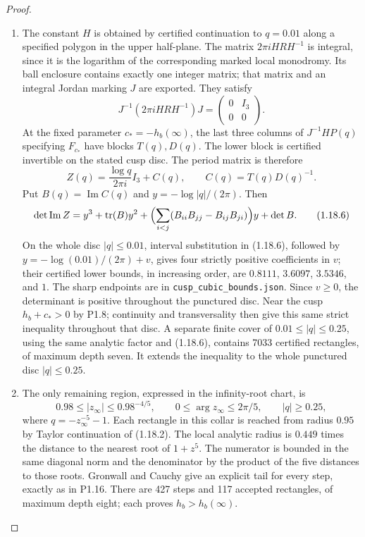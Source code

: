 \documentclass[11pt,a4paper]{article}
\theoremstyle{definition}
\begin{document}
\begin{proof}
\begin{enumerate}[label=\arabic*.]
\item The constant $H$ is obtained by certified continuation to $q=0.01$
along a specified polygon in the upper half-plane.  The matrix
$2\pi iHRH^{-1}$ is integral, since it is the logarithm of the
corresponding marked local monodromy.  Its ball enclosure contains
exactly one integer matrix; that matrix and an integral Jordan
marking $J$ are exported.  They satisfy
\[
 J^{-1}(2\pi iHRH^{-1})J=\begin{pmatrix}0&I_3\\0&0\end{pmatrix}.
\]
At the fixed parameter $c_*=-h_b(\infty)$, the last three columns of
$J^{-1}HP(q)$ specifying $F_{c_*}$ have blocks $T(q),D(q)$.
The lower block is certified invertible on the stated cusp disc.
The period matrix is therefore
\[
 Z(q)=\frac{\log q}{2\pi i}I_3+C(q),\qquad C(q)=T(q)D(q)^{-1}.
\]
Put $B(q)=\operatorname{Im}C(q)$ and $y=-\log|q|/(2\pi)$.
Then
\[
 \det\operatorname{Im}Z
 =y^3+\operatorname{tr}(B)y^2
   +\Bigl(\sum_{i<j}(B_{ii}B_{jj}-B_{ij}B_{ji})\Bigr)y+\det B.
\tag{1.18.6}
\]
On the whole disc $|q|\leq0.01$, interval substitution in (1.18.6),
followed by $y=-\log(0.01)/(2\pi)+v$, gives four strictly positive
coefficients in $v$; their certified lower bounds, in increasing
order, are $0.8111$, $3.6097$, $3.5346$, and $1$.
The sharp endpoints are in \texttt{cusp\_cubic\_bounds.json}.
Since $v\geq0$, the determinant is positive
throughout the punctured disc.  Near the cusp $h_b+c_*>0$ by P1.8;
continuity and transversality then give this same strict inequality
throughout that disc.  A separate finite cover of
$0.01\leq|q|\leq0.25$, using the same analytic factor and (1.18.6),
contains 7033 certified rectangles, of maximum depth seven.  It
extends the inequality to the whole punctured disc $|q|\leq0.25$.

\item The only remaining region, expressed in the infinity-root chart, is
\[
 0.98\leq |z_\infty|\leq0.98^{-4/5},\qquad
 0\leq\arg z_\infty\leq2\pi/5,
 \qquad |q|\geq0.25,
\]
where $q=-z_\infty^{-5}-1$.
Each rectangle in this collar is reached from radius $0.95$ by
Taylor continuation of (1.18.2).  The local analytic radius is
$0.449$ times the distance to the nearest root of $1+z^5$.
The numerator is bounded in the same diagonal norm and the
denominator by the product of the five distances to those roots.
Gronwall and Cauchy give an explicit tail for every step, exactly
as in P1.16.  There are 427 steps and 117 accepted rectangles,
of maximum depth eight; each proves $h_b>h_b(\infty)$.


\end{enumerate}
\end{proof}
\end{document}
